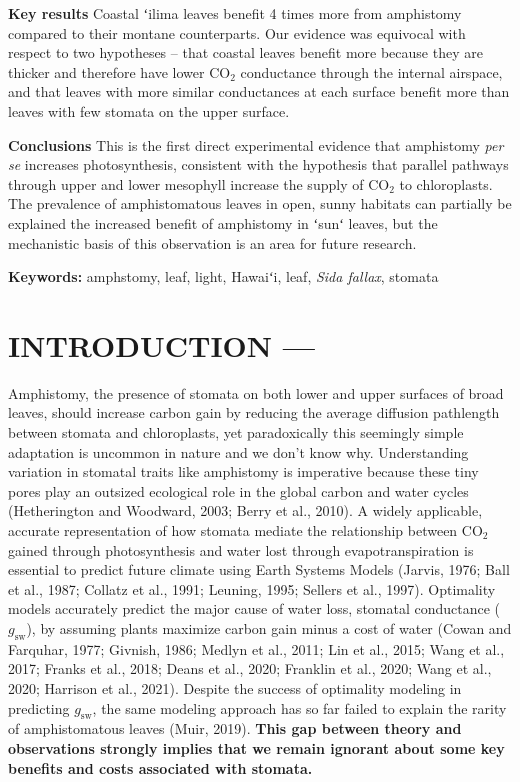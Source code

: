 \documentclass[
  letterpaper,
  DIV=11,
  numbers=noendperiod]{scrartcl}
\begin{document}
\textbf{Key results} Coastal ʻilima leaves benefit 4 times more from
amphistomy compared to their montane counterparts. Our evidence was
equivocal with respect to two hypotheses -- that coastal leaves benefit
more because they are thicker and therefore have lower CO\(_2\)
conductance through the internal airspace, and that leaves with more
similar conductances at each surface benefit more than leaves with few
stomata on the upper surface.

\textbf{Conclusions} This is the first direct experimental evidence that
amphistomy \emph{per se} increases photosynthesis, consistent with the
hypothesis that parallel pathways through upper and lower mesophyll
increase the supply of CO\(_2\) to chloroplasts. The prevalence of
amphistomatous leaves in open, sunny habitats can partially be explained
the increased benefit of amphistomy in ʻsunʻ leaves, but the mechanistic
basis of this observation is an area for future research.

\textbf{Keywords:} amphstomy, leaf, light, Hawaiʻi, leaf, \emph{Sida
fallax}, stomata

\hypertarget{introduction}{%
\section{INTRODUCTION ---}\label{introduction}}

Amphistomy, the presence of stomata on both lower and upper surfaces of
broad leaves, should increase carbon gain by reducing the average
diffusion pathlength between stomata and chloroplasts, yet paradoxically
this seemingly simple adaptation is uncommon in nature and we don't know
why. Understanding variation in stomatal traits like amphistomy is
imperative because these tiny pores play an outsized ecological role in
the global carbon and water cycles (Hetherington and Woodward, 2003;
Berry et al., 2010). A widely applicable, accurate representation of how
stomata mediate the relationship between CO\(_2\) gained through
photosynthesis and water lost through evapotranspiration is essential to
predict future climate using Earth Systems Models (Jarvis, 1976; Ball et
al., 1987; Collatz et al., 1991; Leuning, 1995; Sellers et al., 1997).
Optimality models accurately predict the major cause of water loss,
stomatal conductance (\(g_\mathrm{sw}\)), by assuming plants maximize
carbon gain minus a cost of water (Cowan and Farquhar, 1977; Givnish,
1986; Medlyn et al., 2011; Lin et al., 2015; Wang et al., 2017; Franks
et al., 2018; Deans et al., 2020; Franklin et al., 2020; Wang et al.,
2020; Harrison et al., 2021). Despite the success of optimality modeling
in predicting \(g_\mathrm{sw}\), the same modeling approach has so far
failed to explain the rarity of amphistomatous leaves (Muir, 2019).
\textbf{This gap between theory and observations strongly implies that
we remain ignorant about some key benefits and costs associated with
stomata.}
\end{document}

